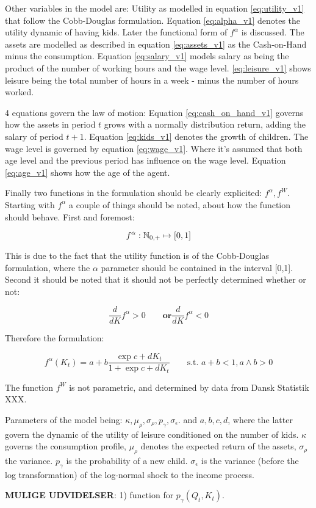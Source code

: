 Other variables in the model are: Utility as modelled in equation \eqref{eq:utility_v1} that follow the Cobb-Douglas formulation. Equation \eqref{eq:alpha_v1} denotes the utility dynamic of having kids. Later the functional form of $f^{\alpha}$ is discussed. The assets are modelled as described in equation \eqref{eq:assets_v1} as the Cash-on-Hand minus the consumption. Equation \eqref{eq:salary_v1} models salary as being the product of the number of working hours and the wage level. \eqref{eq:leisure_v1} shows leisure being the total number of hours in a week - minus the number of hours worked.

4 equations govern the law of motion: Equation \eqref{eq:cash_on_hand_v1} governs how the assets in period $t$ grows with a normally distribution return, adding the salary of period $t+1$. Equation \eqref{eq:kids_v1} denotes the growth of children. The wage level is governed by equation \eqref{eq:wage_v1}. Where it's assumed that both age level and the previous period has influence on the wage level. Equation \eqref{eq:age_v1} shows how the age of the agent.

Finally two functions in the formulation should be clearly explicited: $f^{\alpha}, f^{W}$. Starting with $f^{\alpha}$ a couple of things should be noted, about how the function should behave. First and foremost:

\begin{equation}
    f^{\alpha}: \mathbb{N}_{0,+} \mapsto [0,1]
\end{equation}

This is due to the fact that the utility function is of the Cobb-Douglas formulation, where the $\alpha$ parameter should be contained in the interval [0,1]. Second it should be noted that it should not be perfectly determined whether or not:

\begin{equation}
    \frac{d}{d K}f^{\alpha} > 0 \qquad \textbf{or} \frac{d}{d K}f^{\alpha} < 0
\end{equation}

Therefore the formulation:

\begin{equation}
    f^{\alpha} (K_t)= a + b \frac{\exp{c + d K_t}}{1 + \exp{c + d K_t}}\qquad  \text{s.t. } a + b < 1, a \land b > 0
\end{equation}

The function $f^{W}$ is not parametric, and determined by data from Dansk Statistik XXX.


Parameters of the model being: $\kappa, \mu_\rho, \sigma_\rho, p_\gamma, \sigma_\epsilon$. and $a, b, c, d$, where the latter govern the dynamic of the utility of leisure conditioned on the number of kids. $\kappa$ governs the consumption profile, $\mu_\rho$ denotes the expected return of the assets, $\sigma_\rho$ the variance. $p_\gamma$ is the probability of a new child. $\sigma_{\epsilon}$ is the variance (before the log transformation) of the log-normal shock to the income process.


\textbf{MULIGE UDVIDELSER}: 1) function for $p_\gamma (Q_t, K_t)$. 
